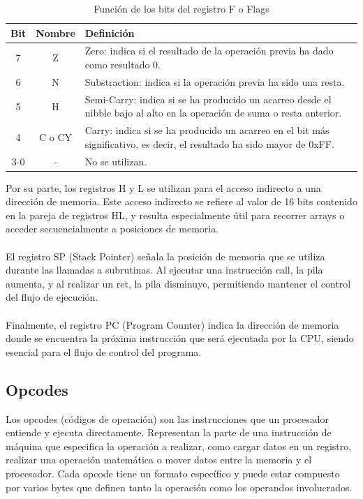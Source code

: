 \begin{table}[H]
    \centering
    \begin{tabular}{|c|c|>{\centering\arraybackslash}p{9cm}|}
        \hline
        \textbf{Bit} & \textbf{Nombre} & \textbf{Definición} \\
        \hline
        7 & Z & Zero: indica si el resultado de la operación previa ha dado como resultado 0. \\
        \hline
        6 & N & Substraction: indica si la operación previa ha sido una resta. \\
        \hline
        5 & H & Semi-Carry: indica si se ha producido un acarreo desde el nibble bajo al alto en la operación de suma o resta anterior. \\
        \hline
        4 & C o CY & Carry: indica si se ha producido un acarreo en el bit más significativo, es decir, el resultado ha sido mayor de 0xFF. \\
        \hline
        3-0 & - & No se utilizan. \\
        \hline
    \end{tabular}
    \caption{Función de los bits del registro F o Flags}
\end{table}

Por su parte, los registros H y L se utilizan para el acceso indirecto a una dirección de memoria. Este acceso indirecto se refiere al valor de 16 bits contenido en la pareja de registros HL, y resulta especialmente útil para recorrer arrays o acceder secuencialmente a posiciones de memoria.
\\\\
El registro SP (Stack Pointer) señala la posición de memoria que se utiliza durante las llamadas a subrutinas. Al ejecutar una instrucción call, la pila aumenta, y al realizar un ret, la pila disminuye, permitiendo mantener el control del flujo de ejecución.
\\\\
Finalmente, el registro PC (Program Counter) indica la dirección de memoria donde se encuentra la próxima instrucción que será ejecutada por la CPU, siendo esencial para el flujo de control del programa.

\subsection{Opcodes}

Los opcodes (códigos de operación) son las instrucciones que un procesador entiende y ejecuta directamente. Representan la parte de una instrucción de máquina que especifica la operación a realizar, como cargar datos en un registro, realizar una operación matemática o mover datos entre la memoria y el procesador. Cada opcode tiene un formato específico y puede estar compuesto por varios bytes que definen tanto la operación como los operandos involucrados.

